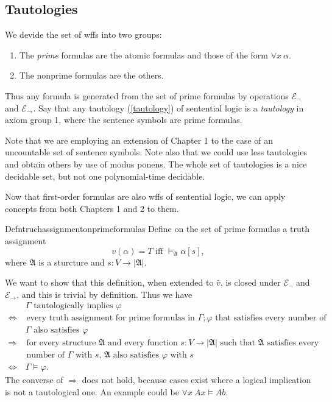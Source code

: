 \subsection*{Tautologies}

We devide the set of wffs into two groups:
\begin{enumerate}
  \item The \textit{prime} formulas are the atomic formulas and those of the form $\forall x\ \alpha$.
  \item The nonprime formulas are the others.
\end{enumerate}
Thus any formula is generated from the set of prime formulas by operations $\mathcal{E}_{\neg}$ and $\mathcal{E}_{\rightarrow}$. Say that any tautology (\ref{tautology}) of sentential logic is a \textit{tautology} in axiom group 1, where the sentence symbols are prime formulas.

Note that we are employing an extension of Chapter 1 to the case of an uncountable set of sentence symbols. Note also that we could use less tautologies and obtain others by use of modus ponens. The whole set of tautologies is a nice decidable set, but not one polynomial-time decidable.

Now that first-order formulas are also wffs of sentential logic, we can apply concepts from both Chapters 1 and 2 to them.

\begin{reference}{Defn}{truchassignmentonprimeformulas}
  Define on the set of prime formulas a truth assignment
  \[
    v(\alpha)=T\text{ iff }\vDash_{\mathfrak{A}}\alpha[s],
  \]
  where $\mathfrak{A}$ is a sturcture and $s:V\rightarrow|\mathfrak{A}|$.
\end{reference}

We want to show that this definition, when extended to $\bar{v}$, is closed under $\mathcal{E}_{\neg}$ and $\mathcal{E}_{\rightarrow}$, and this is trivial by definition. Thus we have
\begin{align*}
              & \ \Gamma \text{ tautologically implies }\varphi                                                                                       \\\Leftrightarrow & \text{ every truth assignment for prime formulas in }                                        \Gamma;\varphi\text{ that satisfies every number of }\\&\ \Gamma\text{ also satisfies }\varphi \\
  \Rightarrow & \text{ for every structure $\mathfrak{A}$ and every function $s:V\rightarrow|\mathfrak{A}|$ such that $\mathfrak{A}$ satisfies every} \\&\text{ number of $\Gamma$ with $s$, $\mathfrak{A}$ also satisfies $\varphi$ with $s$}\\\Leftrightarrow&\ \Gamma\vDash\varphi.
\end{align*}
The converse of $\Rightarrow$ does not hold, because cases exist where a logical implication is not a tautological one. An example could be $\forall x\ A x\vDash A b$.

